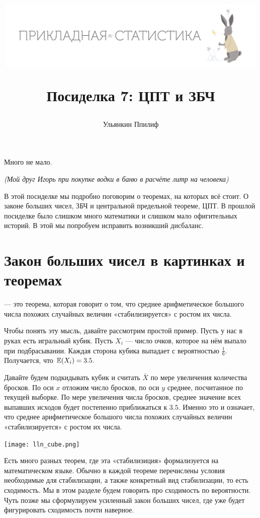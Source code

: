 \documentclass[12pt, a4paper, oneside]{article}
\title{
\begin{center} 
\includegraphics[width=0.99\textwidth]{logo.png}
\end{center}

Посиделка 7: ЦПТ и ЗБЧ}
\date{ } %
\author{Ульянкин Ппилиф}
\begin{document}

\maketitle

\epigraph{Много не мало.}{\textit{(Мой друг Игорь при покупке водки  в баню \newline в расчёте литр на человека)}}

В этой посиделке мы подробно поговорим о теоремах, на которых всё стоит. О законе больших чисел, ЗБЧ и центральной предельной теореме, ЦПТ. В прошлой посиделке было слишком много математики и слишком мало офигительных историй. В этой мы попробуем исправить возникший дисбаланс.


\section{Закон больших чисел в картинках и теоремах}

 --- это теорема, которая говорит о том, что среднее арифметическое большого числа похожих случайных величин  «стабилизируется» с ростом их числа. 

Чтобы понять эту мысль, давайте рассмотрим простой пример. Пусть у нас в руках есть игральный кубик. Пусть $X_i$ --- число очков, которое на нём выпало при подбрасывании. Каждая сторона кубика выпадает с вероятностью $\frac{1}{6}.$ Получается, что $\mathbb{E}(X_i) = 3.5.$ 

Давайте будем подкидывать кубик и считать $\bar X$ по мере увеличения количества бросков. По оси $x$ отложим число бросков, по оси $y$ среднее, посчитанное по текущей выборке. По мере увеличения числа бросков, среднее значение всех выпавших исходов будет постепенно приближаться к $3.5$. Именно это и означает, что среднее арифметическое большого числа похожих случайных величин  «стабилизируется» с ростом их числа.

\begin{center} 
\texttt{[image: lln\_cube.png]}
\end{center} 

Есть много разных теорем, где эта  «стабилизиция» формализуется на математическом языке. Обычно в каждой теореме перечислены условия необходимые для стабилизации, а также конкретный вид стабилизации, то есть сходимость. Мы в этом разделе будем говорить про сходимость по вероятности. Чуть позже мы сформулируем усиленный закон больших чисел, где уже будет фигурировать сходимость почти наверное. 
\end{document}
